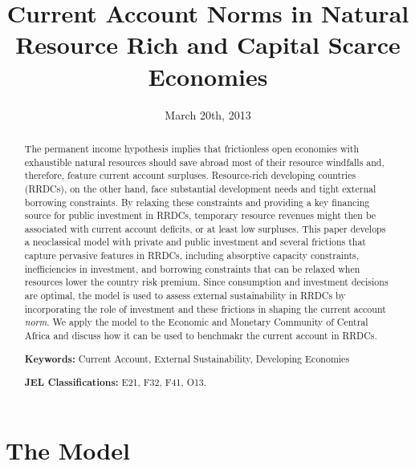 \documentclass[11pt]{article}
\begin{document}
\title{\textbf{Current Account Norms in Natural Resource Rich and Capital
Scarce Economies}}
\date{March 20th, 2013}
\author{}
\maketitle

\begin{abstract}
The permanent income hypothesis implies that frictionless open economies
with exhaustible natural resources should save abroad most of their resource
windfalls and, therefore, feature current account surpluses. Resource-rich
developing countries (RRDCs), on the other hand, face substantial
development needs and tight external borrowing constraints. By relaxing
these constraints and providing a key financing source for public investment
in RRDCs, temporary resource revenues might then be associated with current
account deficits, or at least low surpluses. This paper develops a
neoclassical model with private and public investment and several frictions
that capture pervasive features in RRDCs, including absorptive capacity
constraints, inefficiencies in investment, and borrowing constraints that
can be relaxed when resources lower the country risk premium. Since
consumption and investment decisions are optimal, the model is used to
assess external sustainability in RRDCs by incorporating the role of
investment and these frictions in shaping the current account \textit{norm}.
We apply the model to the Economic and Monetary Community of Central Africa
and discuss how it can be used to benchmakr the current account in RRDCs.

\bigskip \bigskip \bigskip

\noindent%
\textbf{Keywords: }Current Account, External Sustainability, Developing
Economies

\noindent%
\textbf{JEL Classifications:} E21, F32, F41, O13.\medskip
\end{abstract}

\thispagestyle{empty}%
\pagebreak 
\setcounter{page}{3}%
\pagebreak

\section{The Model}
\end{document}
